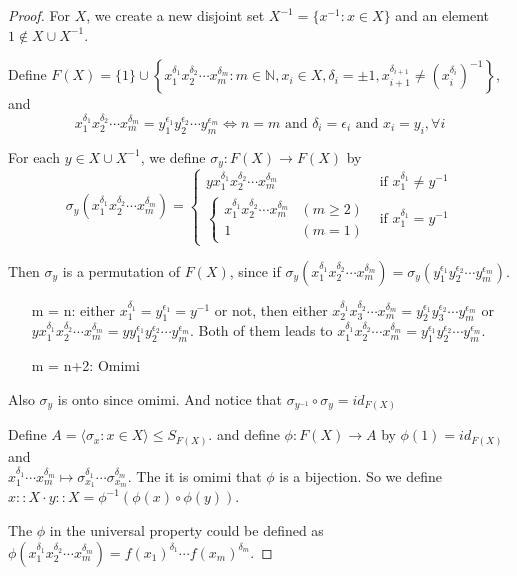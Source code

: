 \begin{proof}
  For $X$, we create a new disjoint set $X^{-1} = \{ x^{-1} : x \in X\}$
  and an element $1 \notin X \cup X^{-1}$.

  Define $F(X) = \{ 1 \} \cup \left\{ x_1^{\delta_1} x_2^{\delta_2} \cdots x_m^{\delta_m} :
   m \in \mathbb{N} , x_i \in X, \delta_i = \pm 1, x_{i+1}^{\delta_{i+1}} \neq
   \left( x_i^{\delta_i} \right)^{-1}\right\}$, and
  \[ x_1^{\delta_1} x_2^{\delta_2} \cdots x_m^{\delta_m} =
    y_1^{\epsilon_1} y_2^{\epsilon_2} \cdots y_m^{\epsilon_m}  \iff n = m \text{ and }
    \delta_i = \epsilon_i \text{ and } x_i = y_i , \forall i \]

  For each $y \in X \cup X^{-1}$, we define $\sigma_y : F(X) \to F(X)$ by
  \[
    \sigma_y (x_1^{\delta_1} x_2^{\delta_2} \cdots x_m^{\delta_m})
    =
    \begin{cases}
      y x_1^{\delta_1} x_2^{\delta_2} \cdots x_m^{\delta_m} & \text{if } x_1^{\delta_1} \neq y^{-1} \\
      \begin{cases}
        x_1^{\delta_1} x_2^{\delta_2} \cdots x_m^{\delta_m} & (m \geq 2) \\
        1 & (m = 1)
      \end{cases} & \text{if } x_1^{\delta_1} = y^{-1}
    \end{cases}
  \]

  Then $\sigma_y$ is a permutation of $F(X)$, since if
  $ \sigma_y(x_1^{\delta_1} x_2^{\delta_2} \cdots x_m^{\delta_m}) =
  \sigma_y(y_1^{\epsilon_1} y_2^{\epsilon_2} \cdots y_m^{\epsilon_m}) $.
  \begin{itemize}
    \item[m = n:] either $x_1^{\delta_1} = y_1^{\epsilon_1} = y^{-1}$ or not,
      then either $x_2^{\delta_1} x_3^{\delta_2} \cdots x_m^{\delta_m} =
  y_2^{\epsilon_1} y_3^{\epsilon_2} \cdots y_m^{\epsilon_m}$ or
  $y x_1^{\delta_1} x_2^{\delta_2} \cdots x_m^{\delta_m} =
  y y_1^{\epsilon_1} y_2^{\epsilon_2} \cdots y_m^{\epsilon_m}$. Both of them leads to
  $x_1^{\delta_1} x_2^{\delta_2} \cdots x_m^{\delta_m} =
  y_1^{\epsilon_1} y_2^{\epsilon_2} \cdots y_m^{\epsilon_m}$.
  \item[m = n+2:] Omimi
  \end{itemize}
  Also $\sigma_y$ is onto since omimi. And notice that $\sigma_{y^{-1}} \circ \sigma_y = id_{F(X)}$

  Define $A = \langle \sigma_x : x \in X \rangle \leq S_{F(X)}$. and define $\phi: F(X) \to A$ by
  $\phi(1) = id_{F(X)}$ and \\ $x_1^{\delta_1} \cdots x_m^{\delta_m} \mapsto \sigma_{x_1}^{\delta_1}
  \cdots \sigma_{x_m}^{\delta_m}$. The it is omimi that $\phi$ is a bijection. So we define
  $x::X \cdot y::X = \phi^{-1}( \phi(x) \circ \phi(y) )$.

  The $\phi$  in the universal property could be defined as
  $\phi(x_1^{\delta_1} x_2^{\delta_2} \cdots x_m^{\delta_m}) = f(x_1)^{\delta_1} \cdots f(x_m)^{\delta_m}$.
\end{proof}

